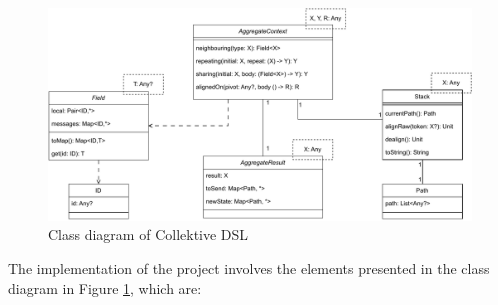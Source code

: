 \begin{figure}[!ht]
    \centering
    \includegraphics[scale=0.73]{document/chapters/4-collektive/images/dsl_class_diagram.pdf}
    \caption{Class diagram of Collektive DSL}
    \label{fig:dsl_class_diagram}
\end{figure}
The implementation of the project involves the elements presented in the class diagram in Figure \ref{fig:dsl_class_diagram}, which are:
